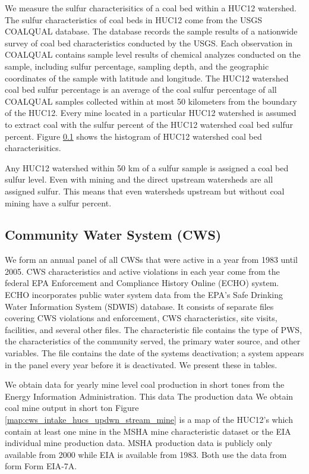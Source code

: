 \documentclass{article}
\begin{document}
We measure the sulfur characterisitics of a coal bed within a HUC12 watershed. The sulfur characteristics of coal beds in HUC12 come from the USGS COALQUAL database. The database records the sample results of a nationwide survey of coal bed characteristics conducted by the USGS. Each observation in COALQUAL contains sample level results of chemical analyzes conducted on the sample, including sulfur percentage, sampling depth, and the geographic coordinates of the sample with latitude and longitude. The HUC12 watershed coal bed sulfur percentage is an average of the coal sulfur percentage of all COALQUAL samples collected within at most 50 kilometers from the boundary of the HUC12. Every mine located in a particular HUC12 watershed is assumed to extract coal with the sulfur percent of the HUC12 watershed coal bed sulfur percent. Figure \ref{} shows the histogram of HUC12 watershed coal bed characterisitics. 

Any HUC12 watershed within 50 km of a sulfur sample is assigned a coal bed sulfur level. Even with mining and the direct upstream watersheds are all assigned sulfur. This means that even watersheds upstream but without coal mining have a sulfur percent. 

\subsection{Community Water System (CWS)}

We form an annual panel of all CWSs that were active in a year from 1983 until 2005. CWS characteristics and active violations in each year come from the federal EPA Enforcement and Compliance History Online (ECHO) system. ECHO incorporates public water system data from the EPA's Safe Drinking Water Information System (SDWIS) database. It consists of separate files covering CWS violations and enforcement, CWS characteristics, site visits, facilities, and several other files. The characteristic file contains the type of PWS, the characteristics of the community served, the primary water source, and other variables. The file contains the date of the systems deactivation; a system appears in the panel every year before it is deactivated. We present these in tables.

We obtain data for yearly mine level coal production in short tones from the Energy Information Administration. This data The production data 
We obtain coal mine output in short ton
Figure \ref{map:cws_intake_hucs_updwn_stream_mine} is a map of the HUC12's which contain at least one mine in the MSHA mine characteristic dataset or the EIA individual mine production data. MSHA production data is publicly only available from 2000 while EIA is available from 1983. Both use the data from form Form EIA‐7A.
\end{document}
